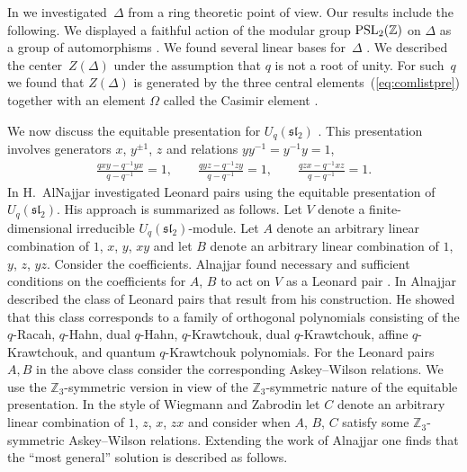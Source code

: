\documentclass[pdftex]{sigma}
\numberwithin{equation}{section}
\begin{document}
In \cite{uaw}
we investigated~$\Delta$
from a ring theoretic point of view.
Our results include the following.
We displayed a faithful action of
the modular group ${\rm  {PSL}}_2(\mathbb Z)$ on $\Delta$
as a group of automorphisms
\cite[Theorems~3.1,~3.13]{uaw}.
We found several linear bases for~$\Delta$
\cite[Theorems~4.1,~7.5]{uaw}.
We described the center~$Z(\Delta)$
under the assumption that $q$ is not a root
of unity. For such~$q$ we found that
$Z(\Delta)$ is generated by the three
central elements~(\ref{eq:comlistpre}) together with an
element $\Omega$ called the Casimir element
\cite[Corollary~8.3]{uaw}.

We now discuss the equitable presentation for
$U_q(\mathfrak{sl}_2)$ \cite{equit}.
 This presentation involves generators
$x$, $y^{\pm 1}$, $z$
and relations $y y^{-1}=y^{-1}y = 1$,
\begin{gather*}
\frac{qxy-q^{-1}yx}{q-q^{-1}} = 1,
\qquad
\frac{qyz-q^{-1}zy}{q-q^{-1}} = 1,
\qquad
\frac{qzx-q^{-1}xz}{q-q^{-1}} = 1.
\end{gather*}
In \cite{alnajjar}
H.~AlNajjar investigated
Leonard pairs using the equitable
presentation of
$U_q(\mathfrak{sl}_2)$.
His approach is summarized as follows.
Let $V$ denote a f\/inite-dimensional irreducible
$U_q(\mathfrak{sl}_2)$-module.
Let $A$ denote an arbitrary
linear combination of
 $1$, $x$, $y$, $xy$ and let $B$ denote an arbitrary
linear combination of $1$, $y$, $z$, $yz$.
Consider the coef\/f\/icients.
Alnajjar
found necessary and suf\/f\/icient conditions on the coef\/f\/icients
for $A$, $B$ to
act on $V$
as a Leonard pair
\cite[Theorem~6.2]{alnajjar}.
In \cite{alnajjar2} Alnajjar  described the class of
Leonard pairs that result from his construction.
He showed that this class corresponds to
a family of orthogonal polynomials consisting of
the $q$-Racah, $q$-Hahn, dual $q$-Hahn, $q$-Krawtchouk,
dual $q$-Krawtchouk,
af\/f\/ine $q$-Krawtchouk, and quantum
$q$-Krawtchouk
polynomials.
For the Leonard pairs $A,B$ in the above class
 consider the corresponding Askey--Wilson relations.
We use the $\mathbb Z_3$-symmetric version in view of
the
$\mathbb Z_3$-symmetric nature of the
equitable presentation.
In the style of
Wiegmann and Zabrodin let
$C$ denote an arbitrary linear combination
of $1$, $z$, $x$, $zx$ and consider when $A$, $B$, $C$ satisfy some
$\mathbb Z_3$-symmetric Askey--Wilson relations.
Extending the work of Alnajjar one f\/inds that
 the ``most general'' solution is described as follows.
\end{document}
